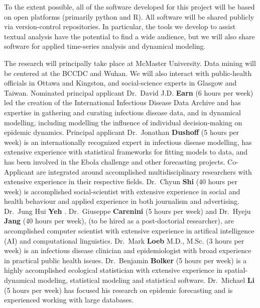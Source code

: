  To the extent possible, all of the software developed for this project will be based on open platforms (primarily python and R). All software will be shared publicly via version-control repositories. In particular, the tools we develop to assist textual analysis have the potential to find a wide audience, but we will also share software for applied time-series analysis and dynamical modeling.


The research will principally take place at McMaster University. Data mining will be centered at the BCCDC and Wuhan. We will also interact with public-health officials in Ottawa and Kingston, and social-science experts in Glasgow and Taiwan.
Nominated principal applicant Dr.\ David J.D. \textbf{Earn} (6 hours per week) led the creation of the International Infectious Disease Data Archive and has expertise in gathering and curating infectious disease data, and in dynamical modelling, including modelling the influence of individual decision-making on epidemic dynamics.
Principal applicant Dr.\ Jonathan \textbf{Dushoff} (5 hours per week) is an internationally recognized expert in infectious disease modelling, has extensive experience with statistical frameworks for fitting models to data, and has been involved in the Ebola challenge and other forecasting projects.
Co-Applicant are integrated around accomplished multidisciplinary researchers with extensive experience in their respective fields.
Dr.\ Chyun \textbf{Shi} (40 hours per week) is accomplished social-scientist with extensive experience in social and health behaviour and applied experience in both journalism and advertising. 
Dr.\ Jung Hui \textbf{Yeh} .
Dr.\ Giuseppe \textbf{Carenini} (5 hours per week) and Dr.\ Hyeju \textbf{Jang} (40 hours per week), (to be hired as a post-doctorial researcher), are accomplished computer scientist with extensive experience in artifical intelligence (AI) and computational linguistics.
Dr.\ Mark \textbf{Loeb} M.D., M.Sc. (3 hours per week) is an infectious disease clinician and epidemiologist with broad experience in practical public health issues.
Dr.\ Benjamin \textbf{Bolker} (5 hours per week) is a highly accomplished ecological statistician with extensive experience in spatial-dynamical modeling, statistical modeling and statistical software.
Dr.\ Michael \textbf{Li} (5 hours per week) has focused his research on epidemic forecasting and is experienced working with large databases. 

